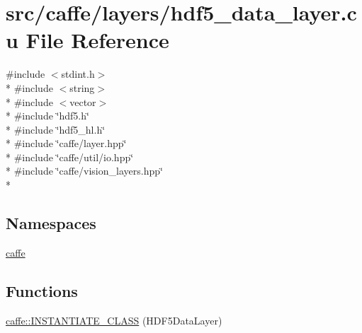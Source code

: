 \hypertarget{hdf5__data__layer_8cu}{\section{src/caffe/layers/hdf5\+\_\+data\+\_\+layer.cu File Reference}
\label{hdf5__data__layer_8cu}
}
{\ttfamily \#include $<$stdint.\+h$>$}\\*
{\ttfamily \#include $<$string$>$}\\*
{\ttfamily \#include $<$vector$>$}\\*
{\ttfamily \#include \char`\"{}hdf5.\+h\char`\"{}}\\*
{\ttfamily \#include \char`\"{}hdf5\+\_\+hl.\+h\char`\"{}}\\*
{\ttfamily \#include \char`\"{}caffe/layer.\+hpp\char`\"{}}\\*
{\ttfamily \#include \char`\"{}caffe/util/io.\+hpp\char`\"{}}\\*
{\ttfamily \#include \char`\"{}caffe/vision\+\_\+layers.\+hpp\char`\"{}}\\*
\subsection*{Namespaces}
\begin{DoxyCompactItemize}
\item 
 \hyperlink{namespacecaffe}{caffe}
\end{DoxyCompactItemize}
\subsection*{Functions}
\begin{DoxyCompactItemize}
\item 
\hyperlink{namespacecaffe_ad29048e04dcd17b90ac51b4666fbbfa7}{caffe\+::\+I\+N\+S\+T\+A\+N\+T\+I\+A\+T\+E\+\_\+\+C\+L\+A\+S\+S} (H\+D\+F5\+Data\+Layer)
\end{DoxyCompactItemize}
